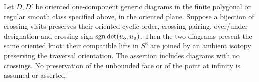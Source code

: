 \begin{theorem}\label{lit:gauss}
Let $D,D'$ be oriented one-component generic diagrams in the finite
polygonal or regular smooth class specified above, in the oriented plane.
Suppose a bijection of crossing visits preserves their oriented
cyclic order, crossing pairing, over/under designation and crossing sign
$\operatorname{sgn}\det(u_{\rm o},u_{\rm u})$.
Then the two diagrams present the same oriented knot: their compatible
lifts in $S^3$ are joined by an ambient isotopy preserving the traversal
orientation. The assertion includes diagrams with no crossings.
No preservation of the unbounded face or of the point at infinity is
assumed or asserted.
\end{theorem}
